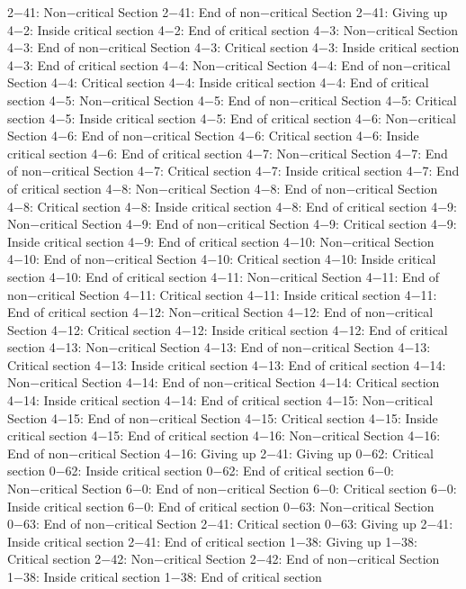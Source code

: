 2−41: Non−critical Section
2−41: End of non−critical Section
2−41: Giving up
4−2: Inside critical section
4−2: End of critical section
4−3: Non−critical Section
4−3: End of non−critical Section
4−3: Critical section
4−3: Inside critical section
4−3: End of critical section
4−4: Non−critical Section
4−4: End of non−critical Section
4−4: Critical section
4−4: Inside critical section
4−4: End of critical section
4−5: Non−critical Section
4−5: End of non−critical Section
4−5: Critical section
4−5: Inside critical section
4−5: End of critical section
4−6: Non−critical Section
4−6: End of non−critical Section
4−6: Critical section
4−6: Inside critical section
4−6: End of critical section
4−7: Non−critical Section
4−7: End of non−critical Section
4−7: Critical section
4−7: Inside critical section
4−7: End of critical section
4−8: Non−critical Section
4−8: End of non−critical Section
4−8: Critical section
4−8: Inside critical section
4−8: End of critical section
4−9: Non−critical Section
4−9: End of non−critical Section
4−9: Critical section
4−9: Inside critical section
4−9: End of critical section
4−10: Non−critical Section
4−10: End of non−critical Section
4−10: Critical section
4−10: Inside critical section
4−10: End of critical section
4−11: Non−critical Section
4−11: End of non−critical Section
4−11: Critical section
4−11: Inside critical section
4−11: End of critical section
4−12: Non−critical Section
4−12: End of non−critical Section
4−12: Critical section
4−12: Inside critical section
4−12: End of critical section
4−13: Non−critical Section
4−13: End of non−critical Section
4−13: Critical section
4−13: Inside critical section
4−13: End of critical section
4−14: Non−critical Section
4−14: End of non−critical Section
4−14: Critical section
4−14: Inside critical section
4−14: End of critical section
4−15: Non−critical Section
4−15: End of non−critical Section
4−15: Critical section
4−15: Inside critical section
4−15: End of critical section
4−16: Non−critical Section
4−16: End of non−critical Section
4−16: Giving up
2−41: Giving up
0−62: Critical section
0−62: Inside critical section
0−62: End of critical section
6−0: Non−critical Section
6−0: End of non−critical Section
6−0: Critical section
6−0: Inside critical section
6−0: End of critical section
0−63: Non−critical Section
0−63: End of non−critical Section
2−41: Critical section
0−63: Giving up
2−41: Inside critical section
2−41: End of critical section
1−38: Giving up
1−38: Critical section
2−42: Non−critical Section
2−42: End of non−critical Section
1−38: Inside critical section
1−38: End of critical section
